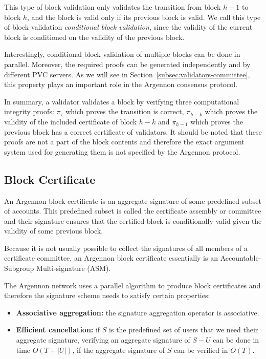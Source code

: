 This type of block validation only validates the transition from block $h-1$ to block $h$, and the block is valid
only if its previous block is valid. We
call this type of block validation \emph{conditional block validation}, since the validity of the current block is
conditioned on the validity of the previous block.

Interestingly, conditional block validation of multiple blocks can be done in parallel. Moreover, the required proofs
can be generated independently and by different PVC servers. As we will see in
Section~\ref{subsec:validators-committee}, this property plays an important role in the Argennon consensus protocol.

In summary, a validator validates a block by verifying three computational integrity proofs: $\pi_{\tau}$ which proves
the transition is correct, $\pi_{h-k}$ which proves the validity of the included certificate of block $h-k$ and
$\pi_{h-1}$ which proves the previous block has a correct certificate of validators. It should be noted that these
proofs are not a part of the block contents and therefore the exact argument system used for generating them is not
specified by the Argennon protocol.

\subsection{Block Certificate}\label{subsec:block-certificate}

An Argennon block certificate is an aggregate signature of some predefined subset of accounts. This predefined subset
is called the certificate assembly or committee and their signature ensures that the certified block is conditionally
valid given the validity of some previous block.

Because it is not usually possible to collect the signatures of all members of a certificate committee, an Argennon
block certificate essentially is an Accountable-Subgroup Multi-signature (ASM).

The Argennon network uses a parallel algorithm to produce block certificates and therefore the signature scheme needs
to satisfy certain properties:
\begin{itemize}
    \item \textbf{Associative aggregation:} the signature aggregation operator is associative.
    \item \textbf{Efficient cancellation:} if $S$ is the predefined set of users that we need their aggregate
    signature, verifying an aggregate signature of $S-U$ can be done in time $O(T+|U|)$, if the aggregate
    signature of $S$ can be verified in $O(T)$.
\end{itemize}

